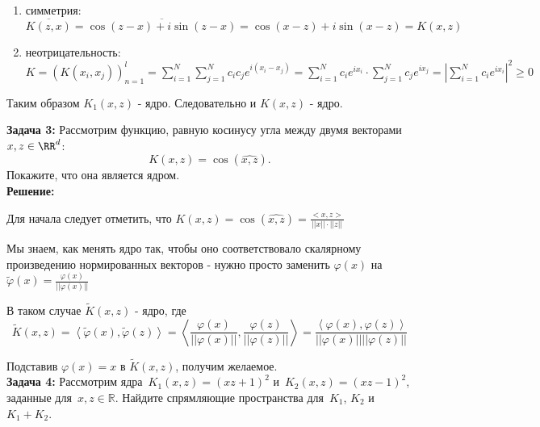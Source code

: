 \documentclass[12pt,letterpaper]{article}
\theoremstyle{definition}
\begin{document}
{\begin{enumerate} 
  \item симметрия: $\overline{K(z, x)} = \overline{\cos(z - x) + i \sin(z - x)} = \cos(x - z) + i \sin(x - z) = K(x, z)$
  \item  неотрицательность: $K = (K(x_{i}, x_{j}))_{n = 1}^{l} = \sum_{i=1}^N \sum_{j=1}^N c_{i} c_{j} e^{i(x_{i} - x_{j})} = \sum_{i=1}^N  c_{i}e^{ix_{i}} \cdot \sum_{j=1}^N c_{j}e^{ix_{j}} = |\sum_{i=1}^N  c_{i}e^{ix_{i}}|^2 \geq 0 $
\end{enumerate}

Таким образом $K_{1}(x, z)$ - ядро. Следовательно и $K(x, z)$ - ядро.
\\
\newpage

\textbf{Задача 3:} Рассмотрим функцию, равную косинусу угла между двумя векторами~$x, z \in \RR^d$:
    \[
        K(x, z) = \cos(\widehat{x, z}).
    \]
    Покажите, что она является ядром.
\\

\textbf{Решение:}

Для начала следует отметить, что $K(x, z) = \cos(\widehat{x, z}) = \frac{<x, z>}{||x|| \cdot ||z||}$

Мы знаем, как менять ядро так, чтобы оно соответствовало скалярному произведению нормированных векторов - нужно просто заменить $\varphi(x)$ на $\widetilde\varphi(x) = \frac{\varphi(x)}{||\varphi(x)||}$

В таком случае $\widetilde K(x, z)$ - ядро, где 
\[
    \widetilde K(x, z) = \left\langle \widetilde\varphi(x), \widetilde\varphi(z) \right\rangle = \left\langle \frac{\varphi(x)}{||\varphi(x)||}, \frac{\varphi(z)}{||\varphi(z)||} \right\rangle  = \frac{\left\langle \varphi(x), \varphi(z) \right\rangle }{||\varphi(x)|| ||\varphi(z)||}
\]

Подставив $\varphi(x) = x$ в $\widetilde K(x, z)$, получим желаемое.
\\

\newpage
\textbf{Задача 4:} Рассмотрим ядра~$K_1(x, z) = (xz + 1)^2$ и~$K_2(x, z) = (xz - 1)^2$,
    заданные для~$x, z \in \mathbb{R} $.
    Найдите спрямляющие пространства для~$K_1$, $K_2$ и~$K_1 + K_2$.
\\

}
\end{document}
